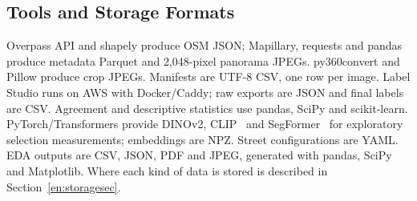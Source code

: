 \subsection{Tools and Storage Formats}
Overpass API and shapely produce OSM JSON; Mapillary, requests and pandas produce metadata Parquet and 2,048-pixel panorama JPEGs. py360convert and Pillow produce crop JPEGs. Manifests are UTF-8 CSV, one row per image. Label Studio runs on AWS with Docker/Caddy; raw exports are JSON and final labels are CSV. Agreement and descriptive statistics use pandas, SciPy and scikit-learn. PyTorch/Transformers provide DINOv2, CLIP~\cite{radford2021clip} and SegFormer~\cite{xie2021segformer} for exploratory selection measurements; embeddings are NPZ. Street configurations are YAML. EDA outputs are CSV, JSON, PDF and JPEG, generated with pandas, SciPy and Matplotlib. Where each kind of data is stored is described in Section~\ref{en:storagesec}.

\needspace{0.5\textheight}
